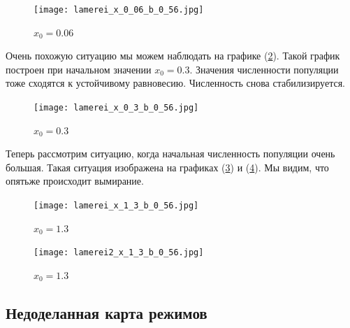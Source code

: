         \begin{figure}
            \centering
            \texttt{[image: lamerei\_x\_0\_06\_b\_0\_56.jpg]}

            \captionsetup{justification=centering}
            \caption{\(x_0 = 0.06\)}
            \label{lamerei_x_0_06_b_0_56}
        \end{figure}

        Очень похожую ситуацию мы можем наблюдать на графике (\ref{lamerei_x_0_3_b_0_56}). Такой график построен при начальном значении \(x_0 = 0.3\). Значения численности популяции тоже сходятся к устойчивому равновесию. Численность снова стабилизируется.
        
        \begin{figure}
            \centering
            \texttt{[image: lamerei\_x\_0\_3\_b\_0\_56.jpg]}

            \captionsetup{justification=centering}
            \caption{\(x_0 = 0.3\)}
            \label{lamerei_x_0_3_b_0_56}
        \end{figure}

        Теперь рассмотрим ситуацию, когда начальная численность популяции очень большая. Такая ситуация изображена на графиках (\ref{lamerei_x_1_3_b_0_56}) и (\ref{lamerei2_x_1_3_b_0_56}). Мы видим, что опятьже происходит вымирание.
        
        \begin{figure}
            \centering
            \texttt{[image: lamerei\_x\_1\_3\_b\_0\_56.jpg]}

            \captionsetup{justification=centering}
            \caption{\(x_0 = 1.3\)}
            \label{lamerei_x_1_3_b_0_56}
        \end{figure}
        
        \begin{figure}
            \centering
            \texttt{[image: lamerei2\_x\_1\_3\_b\_0\_56.jpg]}

            \captionsetup{justification=centering}
            \caption{\(x_0 = 1.3\)}
            \label{lamerei2_x_1_3_b_0_56}
        \end{figure}

    \subsection{Недоделанная карта режимов}

